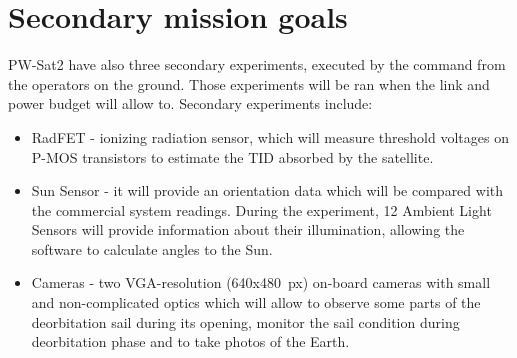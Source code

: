 \section{Secondary mission goals}
PW-Sat2 have also three secondary experiments, executed by the command from the operators on the ground. Those experiments will be ran when the link and power budget will allow to. Secondary experiments include:
\begin{itemize}
    \item RadFET - ionizing radiation sensor, which will measure threshold voltages on P-MOS transistors to estimate the TID absorbed by the satellite.
    \item Sun Sensor -  it will provide an orientation data which will be compared with the commercial system readings. During the experiment, \si{12} Ambient Light Sensors will provide information about their illumination, allowing the software to calculate angles to the Sun.
    \item Cameras - two VGA-resolution (\si{640}x\si{480}~px) on-board cameras with small and non-complicated optics which will allow to observe some parts of the deorbitation sail during its opening, monitor the sail condition during deorbitation phase and to take photos of the Earth.
\end{itemize}


